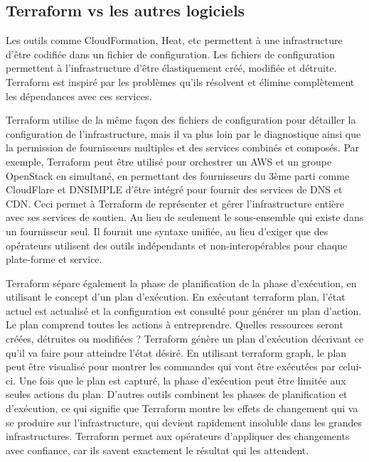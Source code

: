 \documentclass[]{article}
\begin{document}
\subsection{Terraform vs les autres
logiciels}\label{terraform-vs-les-autres-logiciels}

Les outils comme CloudFormation, Heat, etc permettent à une
infrastructure d'être codifiée dans un fichier de configuration. Les
fichiers de configuration permettent à l'infrastructure d'être
élastiquement créé, modifiée et détruite. Terraform est inspiré par les
problèmes qu'ils résolvent et élimine complètement les dépendances avec ces services.

Terraform utilise de la même façon des fichiers de configuration pour
détailler la configuration de l'infrastructure, mais il va plus loin par
le diagnostique ainsi que la permission de fournisseurs multiples et des
services combinés et composés. Par exemple, Terraform peut être utilisé
pour orchestrer un AWS et un groupe OpenStack en simultané, en
permettant des fournisseurs du 3ème parti comme CloudFlare et DNSIMPLE
d'être intégré pour fournir des services de DNS et CDN. Ceci permet à
Terraform de représenter et gérer l'infrastructure entière avec ses
services de soutien. Au lieu de seulement le sous-ensemble qui existe
dans un fournisseur seul. Il fournit une syntaxe unifiée, au lieu
d'exiger que des opérateurs utilisent des outils indépendants et
non-interopérables pour chaque plate-forme et service.

Terraform sépare également la phase de planification de la phase
d'exécution, en utilisant le concept d'un plan d'exécution. En exécutant
terraform plan, l'état actuel est actualisé et la configuration est
consulté pour générer un plan d'action. Le plan comprend toutes les
actions à entreprendre. Quelles ressources seront créées, détruites ou
modifiées ? Terraform génère un plan d'exécution décrivant ce qu'il va
faire pour atteindre l'état désiré. En utilisant terraform graph, le
plan peut être visualisé pour montrer les commandes qui vont être
exécutées par celui-ci. Une fois que le plan est capturé, la phase
d'exécution peut être limitée aux seules actions du plan. D'autres
outils combinent les phases de planification et d'exécution, ce qui
signifie que Terraform montre les effets de changement qui va se
produire sur l'infrastructure, qui devient rapidement insoluble dans les
grandes infrastructures. Terraform permet aux opérateurs d'appliquer des
changements avec confiance, car ils savent exactement le résultat qui les attendent.
\end{document}
